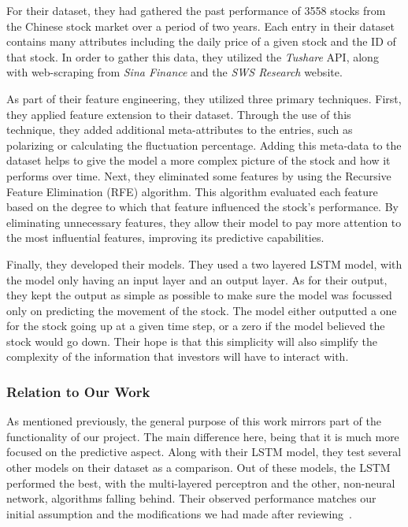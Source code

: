 \documentclass{article}
\begin{document}
    For their dataset, they had gathered the past performance of 3558 stocks from the Chinese stock market over
    a period of two years.  Each entry in their dataset contains many attributes including the daily price of a
    given stock and the ID of that stock.  In order to gather this data, they utilized the \textit{Tushare} API, along
    with web-scraping from \textit{Sina Finance} and the \textit{SWS Research} website.

    As part of their feature engineering, they utilized three primary techniques.  First, they applied feature extension
    to their dataset.  Through the use of this technique, they added additional meta-attributes to the entries, such
    as polarizing or calculating the fluctuation percentage.  Adding this meta-data to the dataset helps to give the model
    a more complex picture of the stock and how it performs over time.  Next, they eliminated some features by using the
    Recursive Feature Elimination (RFE) algorithm.  This algorithm evaluated each feature based on the degree to which
    that feature influenced the stock's performance.  By eliminating unnecessary features, they allow their model to
    pay more attention to the most influential features, improving its predictive capabilities.

    Finally, they developed their models.  They used a two layered LSTM model, with the model only having an input layer
    and an output layer.  As for their output, they kept the output as simple as possible to make sure the model
    was focussed only on predicting the movement of the stock.  The model either outputted a one for the stock going up at
    a given time step, or a zero if the model believed the stock would go down.  Their hope is that this simplicity
    will also simplify the complexity of the information that investors will have to interact with.

    \subsubsection*{Relation to Our Work}

    As mentioned previously, the general purpose of this work mirrors part of the functionality of our project.
    The main difference here, being that it is much more focused on the predictive aspect.  Along with their
    LSTM model, they test several other models on their dataset as a comparison.  Out of these models,
    the LSTM performed the best, with the multi-layered perceptron and the other, non-neural network, algorithms
    falling behind.  Their observed performance matches our initial assumption and the modifications we had made
    after reviewing~\cite{recurrentModeling}.
\end{document}
